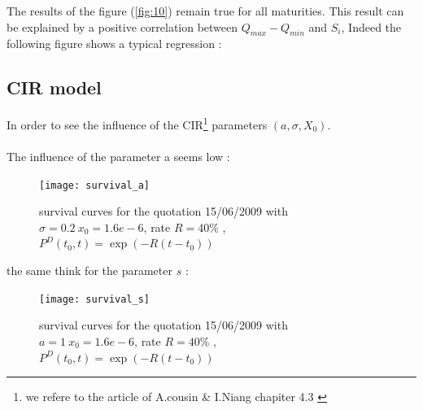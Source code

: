 The results  of the figure (\ref{fig:10})  remain true for all  maturities. This
result can be explained by  a positive correlation between $Q_{max}-Q_{min}$ and
$S_i$, Indeed the following figure shows a typical regression :



\subsection{CIR model}

In order to see  the influence of the CIR\footnote{ we refere  to the article of
  A.cousin \& I.Niang chapiter 4.3 \cite{OTRATS}} parameters $(a,\sigma,X_0)$.

\paragraph{}
The influence of the parameter a seems low :

\begin{figure}[H]
  \centering 
    \texttt{[image: survival\_a]}
  \caption{survival curves for the quotation 15/06/2009 with $\sigma = 0.2 \ x_0
    = 1.6e-6$, rate $R = 40 \%$ , $P^D(t_0,t)=\exp(-R(t-t_0))$}
  \label{fig:11}
\end{figure}

the same think for the parameter $s$ :

\begin{figure}[H]
  \centering 
    \texttt{[image: survival\_s]}
  \caption{survival curves for the quotation 15/06/2009 with $a = 1 \ x_0
    = 1.6e-6$, rate $R = 40 \%$ , $P^D(t_0,t)=\exp(-R(t-t_0))$}
  \label{fig:11}
\end{figure}
